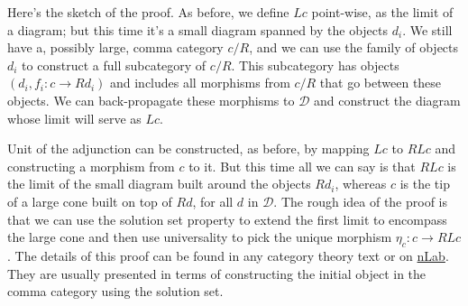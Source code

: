 \documentclass[11pt]{amsart}
\newcommand{\cat}[1]{\mathcal{#1}}
\begin{document}
Here's the sketch of the proof. As before, we define $L c$ point-wise, as the limit of a diagram; but this time it's a small diagram spanned by the objects $d_i$. We still have a, possibly large, comma category $c/R$, and we can use the family of objects $d_i$ to construct a full subcategory of $c/R$. This subcategory has objects $(d_i, f_i \colon c \to R d_i)$ and includes all morphisms from $c/R$ that go between these objects. We can back-propagate these morphisms to $\cat D$ and construct the diagram whose limit will serve as $L c$. 

Unit of the adjunction can be constructed, as before, by mapping $L c$ to $R L c$ and constructing a morphism from $c$ to it. But this time all we can say is that $R L c$ is the limit of the small diagram built around the objects $R d_i$, whereas $c$ is the tip of a large cone built on top of $R d$, for all $d$ in $\cat D$. The rough idea of the proof is that we can use the solution set property to extend the first limit to encompass the large cone and then use universality to pick the unique morphism $\eta_c \colon c \to R L c$. The details of this proof can be found in any category theory text or on \href{https://ncatlab.org/nlab/show/adjoint+functor+theorem}{nLab}. They are usually presented in terms of constructing the initial object in the comma category using the solution set.
\end{document}
